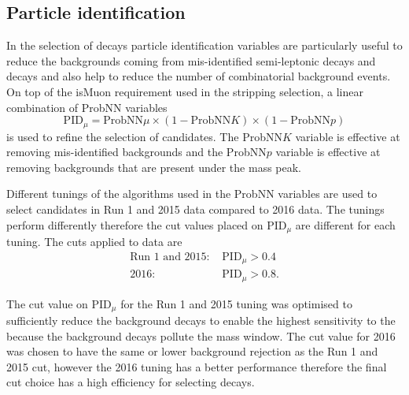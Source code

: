 


\subsection{Particle identification}
\label{sec:BFpid}

In the selection of \bmumu decays particle identification variables are particularly useful to reduce the backgrounds coming from mis-identified semi-leptonic decays and \bhh decays and also help to reduce the number of combinatorial background events. On top of the isMuon requirement used in the stripping selection, a linear combination of ProbNN variables 
\begin{equation}
\text{PID}_{\mu} = \text{ProbNN}\mu \times(1 -  \text{ProbNN}K)  \times(1 -  \text{ProbNN}p) 
\end{equation}
is used to refine the selection of \bmumu candidates. The ProbNN$K$ variable is effective at removing mis-identified \bhh backgrounds and the ProbNN$p$ variable is effective at removing \lambdab backgrounds that are present under the \bd mass peak. 

Different tunings of the algorithms used in the ProbNN variables are used to select candidates in Run 1 and 2015 data compared to 2016 data. The tunings perform differently therefore the cut values placed on PID$_{\mu}$ are different for each tuning. The cuts applied to data are
\begin{equation}
\begin{split}
\text{Run 1 and 2015:}& \text{ PID}_{\mu} > 0.4 \\
\text{2016:}& \text{ PID}_{\mu} > 0.8.
\end{split}
\end{equation}

The cut value on PID$_{\mu}$ for the Run 1 and 2015 tuning was optimised to sufficiently reduce the background decays to enable the highest sensitivity to the \bdmumu because the background decays pollute the \bd mass window. The cut value for 2016 was chosen to have the same or lower background rejection as the Run 1 and 2015 cut, however the 2016 tuning has a better performance therefore the final cut choice has a high efficiency for selecting \bmumu decays. 

